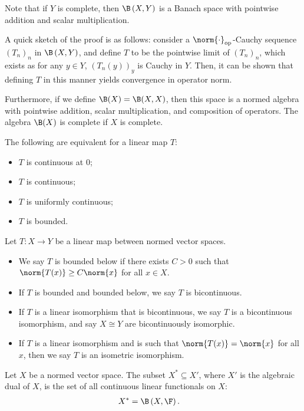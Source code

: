 \begin{remark}
  Note that if $Y$ is complete, then $\B\left(X,Y\right)$ is a Banach space with pointwise addition and scalar multiplication.\newline

  A quick sketch of the proof is as follows: consider a $\norm{\cdot}_{\op}$-Cauchy sequence $\left(T_n\right)_n$ in $\B\left(X,Y\right)$, and define $T$ to be the pointwise limit of $\left(T_n\right)_n$, which exists as for any $y\in Y$, $\left(T_n\left(y\right)\right)_{y}$ is Cauchy in $Y$. Then, it can be shown that defining $T$ in this manner yields convergence in operator norm.\newline

  Furthermore, if we define $\B(X) = \B(X,X)$, then this space is a normed algebra with pointwise addition, scalar multiplication, and composition of operators. The algebra $\B(X)$ is complete if $X$ is complete.
\end{remark}
\begin{fact}
  The following are equivalent for a linear map $T$:
  \begin{itemize}
    \item $T$ is continuous at $0$;
    \item $T$ is continuous;
    \item $T$ is uniformly continuous;
    \item $T$ is bounded.
  \end{itemize}
\end{fact}
\begin{definition}
  Let $T\colon X\rightarrow Y$ be a linear map between normed vector spaces.
  \begin{itemize}
    \item We say $T$ is bounded below if there exists $C > 0$ such that $\norm{T(x)}\geq C\norm{x}$ for all $x\in X$.
    \item If $T$ is bounded and bounded below, we say $T$ is bicontinuous.
    \item If $T$ is a linear isomorphism that is bicontinuous, we say $T$ is a bicontinuous isomorphism, and say $X\cong Y$ are bicontinuously isomorphic.
    \item If $T$ is a linear isomorphism and is such that $\norm{T(x)} = \norm{x}$ for all $x$, then we say $T$ is an isometric isomorphism.
  \end{itemize}
\end{definition}
\begin{definition}
  Let $X$ be a normed vector space. The subset $X^{\ast}\subseteq X'$, where $X'$ is the algebraic dual of $X$, is the set of all continuous linear functionals on $X$:
  \begin{align*}
    X^{\ast} &= \B\left(X,\F\right).
  \end{align*}
\end{definition}
